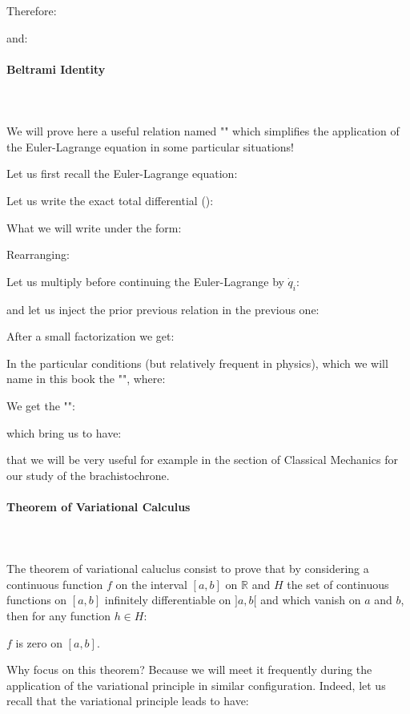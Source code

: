 	Therefore:
	
	and:
	
	
	\pagebreak
	\paragraph{Beltrami Identity}\mbox{}\\\\
	We will prove here a useful relation named "" which simplifies the application of the Euler-Lagrange equation in some particular situations!
	
	Let us first recall the Euler-Lagrange equation:
	
	Let us write the exact total differential ():
	
	What we will write under the form:
	
	Rearranging:
	
	Let us multiply before continuing the Euler-Lagrange by $\dot{q}_i$:
	
	and let us inject the prior previous relation in the previous one:
	
	After a small factorization we get:
	
	In the particular conditions (but relatively frequent in physics), which we will name in this book the "", where:
	
	We get the "":
	
	which bring us to have:
	
	that we will be very useful for example in the section of Classical Mechanics for our study of the brachistochrone.
	
	\paragraph{Theorem of Variational Calculus}\mbox{}\\\\
	The theorem of variational caluclus consist to prove that by considering a continuous function $f$ on the interval $[a,b]$ on $\mathbb{R}$ and $H$ the set of continuous functions on $[a,b]$ infinitely differentiable on $]a,b[$ and which vanish on $a$ and $b$, then for any function $h\in H$:
	
	$f$ is zero on $[a,b]$.

	Why focus on this theorem? Because we will meet it frequently during the application of the variational principle in similar configuration. Indeed, let us recall that the variational principle leads to have:
	

